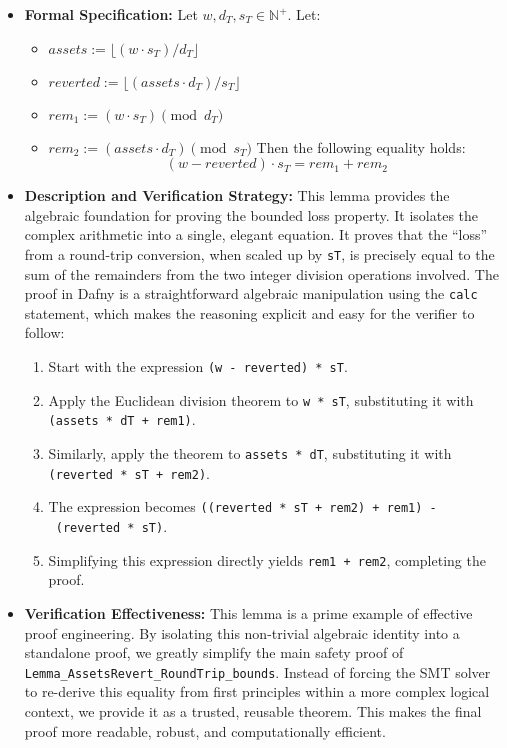 \documentclass[
  english,
  onecolumn]{article}
\providecommand{\tightlist}{%
  \setlength{\itemsep}{0pt}\setlength{\parskip}{0pt}}
\begin{document}
\begin{itemize}
\tightlist
\item
  \textbf{Formal Specification:} Let \(w, d_T, s_T \in \mathbb{N}^+\).
  Let:

  \begin{itemize}
  \tightlist
  \item
    \(assets := \lfloor (w \cdot s_T) / d_T \rfloor\)
  \item
    \(reverted := \lfloor (assets \cdot d_T) / s_T \rfloor\)
  \item
    \(rem_1 := (w \cdot s_T) \pmod{d_T}\)
  \item
    \(rem_2 := (assets \cdot d_T) \pmod{s_T}\) Then the following
    equality holds: \[ (w - reverted) \cdot s_T = rem_1 + rem_2 \]
  \end{itemize}
\item
  \textbf{Description and Verification Strategy:} This lemma provides
  the algebraic foundation for proving the bounded loss property. It
  isolates the complex arithmetic into a single, elegant equation. It
  proves that the ``loss'' from a round-trip conversion, when scaled up
  by \texttt{sT}, is precisely equal to the sum of the remainders from
  the two integer division operations involved. The proof in Dafny is a
  straightforward algebraic manipulation using the \texttt{calc}
  statement, which makes the reasoning explicit and easy for the
  verifier to follow:

  \begin{enumerate}
  \def\labelenumi{\arabic{enumi}.}
  \tightlist
  \item
    Start with the expression \texttt{(w\ -\ reverted)\ *\ sT}.
  \item
    Apply the Euclidean division theorem to \texttt{w\ *\ sT},
    substituting it with \texttt{(assets\ *\ dT\ +\ rem1)}.
  \item
    Similarly, apply the theorem to \texttt{assets\ *\ dT}, substituting
    it with \texttt{(reverted\ *\ sT\ +\ rem2)}.
  \item
    The expression becomes
    \texttt{((reverted\ *\ sT\ +\ rem2)\ +\ rem1)\ -\ (reverted\ *\ sT)}.
  \item
    Simplifying this expression directly yields \texttt{rem1\ +\ rem2},
    completing the proof.
  \end{enumerate}
\item
  \textbf{Verification Effectiveness:} This lemma is a prime example of
  effective proof engineering. By isolating this non-trivial algebraic
  identity into a standalone proof, we greatly simplify the main safety
  proof of \texttt{Lemma\_AssetsRevert\_RoundTrip\_bounds}. Instead of
  forcing the SMT solver to re-derive this equality from first
  principles within a more complex logical context, we provide it as a
  trusted, reusable theorem. This makes the final proof more readable,
  robust, and computationally efficient.
\end{itemize}
\end{document}
